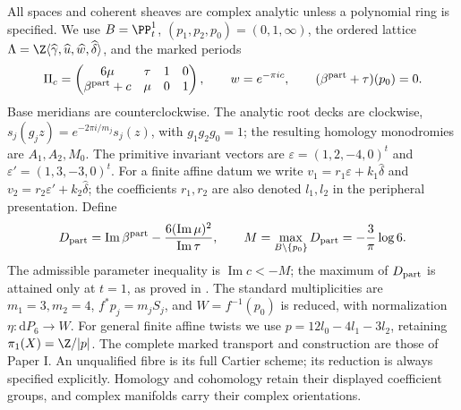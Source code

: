 \begin{definition}
\hypertarget{tag-P202}{}\label{def:II:marked-conventions}
All spaces and coherent sheaves are complex analytic unless a polynomial
ring is specified. We use $B=\PP^1_t$, $(p_1,p_2,p_0)=(0,1,\infty)$,
the ordered lattice
$\Lambda=\Z\langle\widehat\gamma,\widehat u,\widehat w,\widehat\delta\rangle$,
and the marked periods
\[
\Pi_c=\begin{pmatrix}6\mu&\tau&1&0\\\beta^{\rm part}+c&\mu&0&1\end{pmatrix},
\qquad w=e^{-\pi i c},\qquad (\beta^{\rm part}+\tau)(p_0)=0.
\]
Base meridians are counterclockwise. The analytic root decks are clockwise,
$s_j(g_jz)=e^{-2\pi i/m_j}s_j(z)$, with $g_1g_2g_0=1$;
the resulting homology monodromies are $A_1,A_2,M_0$.
The primitive invariant vectors are
$\varepsilon=(1,2,-4,0)^t$ and
$\varepsilon'=(1,3,-3,0)^t$.
For a finite affine datum we write
$v_1=r_1\varepsilon+k_1\widehat\delta$ and
$v_2=r_2\varepsilon'+k_2\widehat\delta$; the coefficients
$r_1,r_2$ are also denoted $l_1,l_2$ in the peripheral presentation.
Define
\[
 D_{\rm part}=\operatorname{Im}\beta^{\rm part}
       -\frac{6(\operatorname{Im}\mu)^2}{\operatorname{Im}\tau},
 \qquad M=\max_{B\setminus\{p_0\}}D_{\rm part}
       =-\frac3\pi\log6.
\]
The admissible parameter inequality is $\operatorname{Im}c<-M$;
the maximum of $D_{\rm part}$ is attained only at $t=1$, as proved in .
The standard multiplicities are $m_1=3,m_2=4$,
$f^*p_j=m_jS_j$, and $W=f^{-1}(p_0)$ is reduced, with normalization
$\eta:\mathrm dP_6\to W$.
For general finite affine twists we use
$p=12l_0-4l_1-3l_2$, retaining $\pi_1(X)=\Z/|p|$.
The complete marked transport and construction are those of Paper I.
An unqualified fibre is its full Cartier scheme; its reduction is always
specified explicitly. Homology and cohomology retain their displayed
coefficient groups, and complex manifolds carry their complex orientations.
\end{definition}

